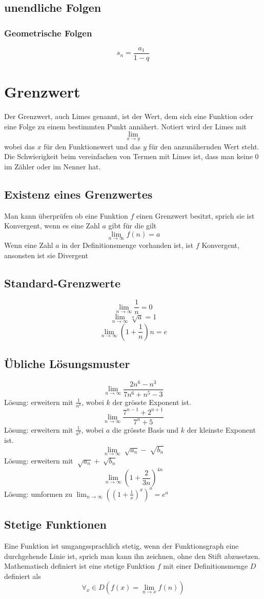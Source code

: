 \documentclass{article}
\begin{document}
\subsection{unendliche Folgen}
\subsubsection{Geometrische Folgen}
\[
s_n = \frac{a_1}{1-q} 
\]
\section{Grenzwert}
Der Grenzwert, auch Limes genannt, ist der Wert, dem sich eine Funktion oder eine Folge zu einem bestimmten Punkt annähert. Notiert wird der Limes mit $$ \lim_{x \to y}$$wobei das $x$ für den Funktionswert und das $y$ für den anzunähernden Wert steht. Die Schwierigkeit beim vereinfachen von Termen mit Limes ist, dass man keine 0 im Zähler oder im Nenner hat.
\subsection{Existenz eines Grenzwertes}
Man kann überprüfen ob eine Funktion $f$ einen Grenzwert besitzt, sprich sie ist Konvergent, wenn es eine Zahl $a$ gibt für die gilt
$$ \lim_{n \to \infty}f(n) = a$$
Wenn eine Zahl $a$ in der Definitionsmenge vorhanden ist, ist $f$ Konvergent, ansonsten ist sie Divergent
\subsection{Standard-Grenzwerte}
$$ \lim_{n \to \infty} \frac{1}{n} = 0$$
$$ \lim_{n \to \infty} \sqrt[n]{a} = 1$$
$$ \lim_{n \to \infty} \left(1+ \frac{1}{n} \right)^{}n = e$$
\subsection{Übliche Lösungsmuster}
$$ \lim_{n \to \infty} \frac{2n^{6}-n^{3}}{7n^{6}+n^{5}-3} $$Lösung: erweitern mit $ \frac{1}{n^{k}}$, wobei $k$ der grösste Exponent ist.
$$ \lim_{n \to \infty} \frac{7^{n-1}+2^{n+1}}{7^{n}+5}$$
Lösung: erweitern mit $ \frac{1}{a^{k}} $, wobei $a$ die grösste Basis und $k$ der kleinste Exponent ist.
$$ \lim_{n \to \infty} \sqrt[]{a_n} - \sqrt[]{b_n}$$ Lösung: erweitern mit $ \sqrt[]{a_n}+ \sqrt[]{b_n}$
$$ \lim_{n \to \infty} \left( 1+ \frac{2}{3n} \right)^{4n}$$
Lösung: umformen zu $ \lim_{n \to \infty} \left(\left(1+ \frac{1}{x}\right)^{x}\right)^{a} = e^{a}$
\subsection{Stetige Funktionen}
Eine Funktion ist umgangssprachlich stetig, wenn der Funktionsgraph eine durchgehende Linie ist, sprich man kann ihn zeichnen, ohne den Stift abzusetzen.
Mathematisch definiert ist eine stetige Funktion $f$ mit einer Definitionsmenge $D$ definiert als
$$\forall_x \in D (f(x) = \lim_{n \to x}f(n))$$
\end{document}
